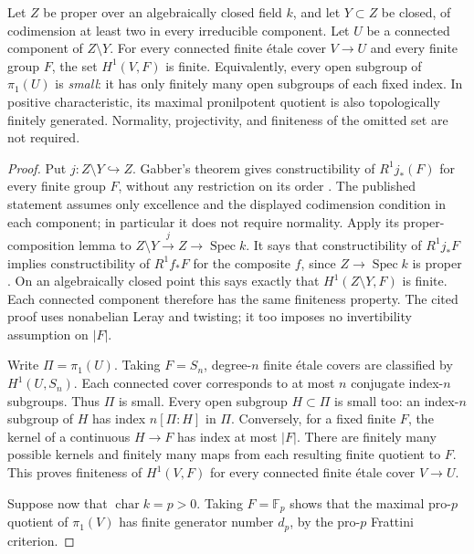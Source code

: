 \begin{proposition}
\label{D:codim-two-small}
\label{D:finite-boundary-nilpotent}
Let $Z$ be proper over an algebraically closed field $k$, and let
$Y\subset Z$ be closed, of codimension at least two in every
irreducible component. Let $U$ be a connected component of
$Z\setminus Y$. For every connected finite \'etale cover
$V\to U$ and every finite group $F$, the set $H^1(V,F)$ is finite.
Equivalently, every open subgroup of $\pi_1(U)$ is \emph{small}:
it has only finitely many open subgroups of each fixed index.
In positive characteristic, its maximal pronilpotent quotient is
also topologically finitely generated. Normality, projectivity,
and finiteness of the omitted set are not required.
\end{proposition}
\begin{proof}
Put $j:Z\setminus Y\hookrightarrow Z$. Gabber's theorem gives
constructibility of $R^1j_*(F)$ for every finite group $F$,
without any restriction on its order
\cite[Theorem 1.3, p.~529]{ILOXXID}.
The published statement assumes only excellence and the
displayed codimension condition in each component; in
particular it does not require normality.
Apply its proper-composition lemma to
$Z\setminus Y\xrightarrow{j}Z\to\operatorname{Spec}k$.
It says that constructibility of $R^1j_*F$ implies
constructibility of $R^1f_*F$ for the composite $f$, since
$Z\to\operatorname{Spec}k$ is proper
\cite[Lemma 3.2.1(ii), pp.~536--537]{ILOXXID}.
On an algebraically closed point this says exactly that
$H^1(Z\setminus Y,F)$ is finite. Each connected component
therefore has the same finiteness property. The cited proof
uses nonabelian Leray and twisting; it too imposes no
invertibility assumption on $|F|$.

Write $\Pi=\pi_1(U)$. Taking $F=S_n$, degree-$n$ finite
\'etale covers are classified by $H^1(U,S_n)$. Each connected
cover corresponds to at most $n$ conjugate index-$n$ subgroups.
Thus $\Pi$ is small. Every open subgroup $H\subset\Pi$ is
small too: an index-$n$ subgroup of $H$ has index
$n[\Pi:H]$ in $\Pi$. Conversely, for a fixed finite $F$,
the kernel of a continuous $H\to F$ has index at most $|F|$.
There are finitely many possible kernels and finitely many
maps from each resulting finite quotient to $F$. This
proves finiteness of $H^1(V,F)$ for every connected finite
\'etale cover $V\to U$.

Suppose now that $\operatorname{char}k=p>0$. Taking
$F=\mathbb F_p$ shows that the maximal pro-$p$ quotient
of $\pi_1(V)$ has finite generator number $d_p$, by the
pro-$p$ Frattini criterion.


\end{proof}
